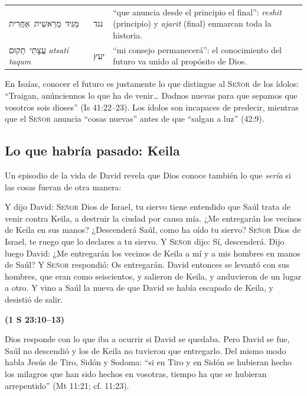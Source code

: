 \documentclass[11pt,letterpaper]{article}
\newcommand{\heb}[1]{\mbox{\foreignlanguage{hebrew}{#1}}}
\newcommand{\SENOR}{\textsc{Señor}}
\newcommand{\fuente}[1]{\par\hfill{\upshape\bfseries\small\textcolor{azul}{#1}}}
\begin{document}
\begin{filologia}[Is 46:10]
\begin{tabular}{@{}L{3.2cm}L{1.6cm}L{10cm}@{}}
\heb{מַגִּיד מֵרֵאשִׁית אַחֲרִית} & \heb{נגד} & ``que anuncia desde el principio el final'': \emph{reshit} (principio) y \emph{ajarit} (final) enmarcan toda la historia. \\[2pt]
\heb{עֲצָתִי תָקוּם} \emph{atsatí taqum} & \heb{יעץ} & ``mi consejo permanecerá'': el conocimiento del futuro va unido al propósito de Dios. \\
\end{tabular}
\end{filologia}

En Isaías, conocer el futuro es justamente lo que distingue al \SENOR{} de los ídolos: ``Traigan, anúnciennos lo que ha de venir\ldots{} Dadnos nuevas para que sepamos que vosotros sois dioses'' (Is 41:22--23). Los ídolos son incapaces de predecir, mientras que el \SENOR{} anuncia ``cosas nuevas'' antes de que ``salgan a luz'' (42:9).

\subsection{Lo que habría pasado: Keila}
Un episodio de la vida de David revela que Dios conoce también lo que \emph{sería} si las cosas fueran de otra manera:

\begin{cita}Y dijo David: \SENOR{} Dios de Israel, tu siervo tiene entendido que Saúl trata de venir contra Keila, a destruir la ciudad por causa mía. ¿Me entregarán los vecinos de Keila en sus manos? ¿Descenderá Saúl, como ha oído tu siervo? \SENOR{} Dios de Israel, te ruego que lo declares a tu siervo. Y \SENOR{} dijo: Sí, descenderá. Dijo luego David: ¿Me entregarán los vecinos de Keila a mí y a mis hombres en manos de Saúl? Y \SENOR{} respondió: Os entregarán. David entonces se levantó con sus hombres, que eran como seiscientos, y salieron de Keila, y anduvieron de un lugar a otro. Y vino a Saúl la nueva de que David se había escapado de Keila, y desistió de salir.\fuente{(1 S 23:10--13)}\end{cita}

Dios responde con lo que iba a ocurrir si David se quedaba. Pero David se fue, Saúl no descendió y los de Keila no tuvieron que entregarlo. Del mismo modo habla Jesús de Tiro, Sidón y Sodoma: ``si en Tiro y en Sidón se hubieran hecho los milagros que han sido hechos en vosotras, tiempo ha que se hubieran arrepentido'' (Mt 11:21; cf. 11:23).
\end{document}

